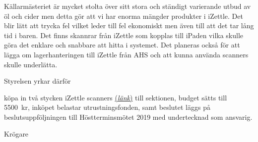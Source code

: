 \documentclass[../_main/handlingar.tex]{subfiles}
\begin{document}

Källarmästeriet är mycket stolta över sitt stora och ständigt varierande utbud av öl 
och cider men detta gör att vi har enorma mängder produkter i iZettle. Det blir lätt att 
trycka fel vilket leder till fel ekonomiskt men även till att det tar lång tid i baren. 
Det finns skannrar från iZettle som kopplas till iPaden vilka skulle göra det enklare och 
snabbare att hitta i systemet. Det planeras också för att lägga om lagerhanteringen till 
iZettle från AHS och att kunna använda scanners skulle underlätta. 



Styrelsen yrkar därför 

\begin{attsatser}
    \att köpa in två stycken iZettle scanners \href{https://tillbehor.izettle.com/streckkodslasare/scanner}{(\textit{länk})} till sektionen,
    \att budget sätts till \SI{5500}{kr}, 
    \att inköpet belastar utrustningsfonden, samt
    \att beslutet läggs på beslutsuppföljningen till Höstterminsmötet 2019 med undertecknad som ansvarig.
  
\end{attsatser}

\begin{signatures}{1}
    \ist
    \signature{\krog}{Krögare}
    
\end{signatures}
\end{document}
